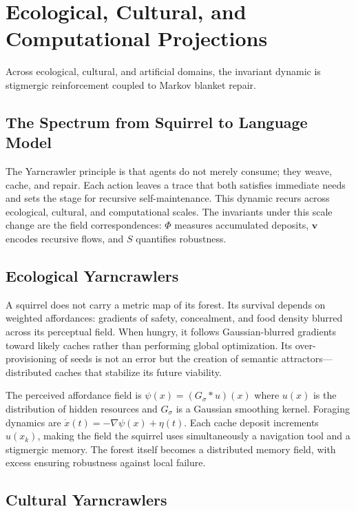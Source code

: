 \chapter{Ecological, Cultural, and Computational Projections}
\label{ch:ecological_cultural}

\epigraph{Across ecological, cultural, and artificial domains, the invariant dynamic
is stigmergic reinforcement coupled to Markov blanket repair.}{}

\section{The Spectrum from Squirrel to Language Model}

The Yarncrawler principle is that agents do not merely consume; they weave, cache, and
repair. Each action leaves a trace that both satisfies immediate needs and sets the
stage for recursive self-maintenance. This dynamic recurs across ecological, cultural,
and computational scales. The invariants under this scale change are the \RSVP field
correspondences: $\Phi$ measures accumulated deposits, $\mathbf{v}$ encodes recursive
flows, and $S$ quantifies robustness.

\section{Ecological Yarncrawlers}

A squirrel does not carry a metric map of its forest. Its survival depends on weighted
affordances: gradients of safety, concealment, and food density blurred across its
perceptual field. When hungry, it follows Gaussian-blurred gradients toward likely
caches rather than performing global optimization. Its over-provisioning of seeds is
not an error but the creation of semantic attractors---distributed caches that stabilize
its future viability.

The perceived affordance field is $\psi(x) = (G_\sigma * u)(x)$ where $u(x)$ is the
distribution of hidden resources and $G_\sigma$ is a Gaussian smoothing kernel.
Foraging dynamics are $\dot{x}(t) = -\nabla\psi(x) + \eta(t)$. Each cache deposit
increments $u(x_k)$, making the field the squirrel uses simultaneously a navigation
tool and a stigmergic memory. The forest itself becomes a distributed memory field,
with excess ensuring robustness against local failure.

\section{Cultural Yarncrawlers}

